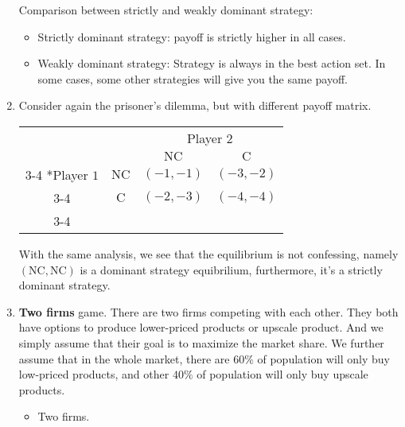 \begin{eg}
\begin{enumerate}
		      \begin{remark}
			      Comparison between strictly and weakly dominant strategy:
			      \begin{itemize}
				      \item Strictly dominant strategy: payoff is strictly higher in all cases.
				      \item Weakly dominant strategy: Strategy is always in the best action set. In some cases, some other strategies will give you the same payoff.
			      \end{itemize}
		      \end{remark}
		\item Consider again the prisoner's dilemma, but with different payoff matrix.
		      \begin{table}[H]
			      \centering
			      \setlength{\extrarowheight}{2pt}
			      \begin{tabular}{cc|c|c|}
				                                & \multicolumn{1}{c}{} & \multicolumn{2}{c}{Player $2$}                                       \\
				                                & \multicolumn{1}{c}{} & \multicolumn{1}{c}{$\mathrm{NC}$} & \multicolumn{1}{c}{$\mathrm{C}$} \\\cline{3-4}
				      \multirow{2}*{Player $1$} & $\mathrm{NC}$        & $(-1, -1)$                        & $(-3, -2)$                       \\\cline{3-4}
				                                & $\mathrm{C}$         & $(-2, -3)$                        & $(-4, -4)$                       \\\cline{3-4}
			      \end{tabular}
		      \end{table}
		      With the same analysis, we see that the equilibrium is not confessing, namely \((\mathrm{NC}, \mathrm{NC})\) is a dominant strategy equibrilium, furthermore, it's a
		      strictly dominant strategy.
		\item \textbf{Two firms} game. There are two firms competing with each other. They both have options to produce lower-priced products or upscale product. And we simply assume that
		      their goal is to maximize the market share. We further assume that in the whole market, there are \(60\%\) of population will only buy low-priced products, and other \(40\%\)
		      of population will only buy upscale products.
		      \begin{itemize}
			      \item Two firms.

\end{itemize}
\end{enumerate}
\end{eg}

